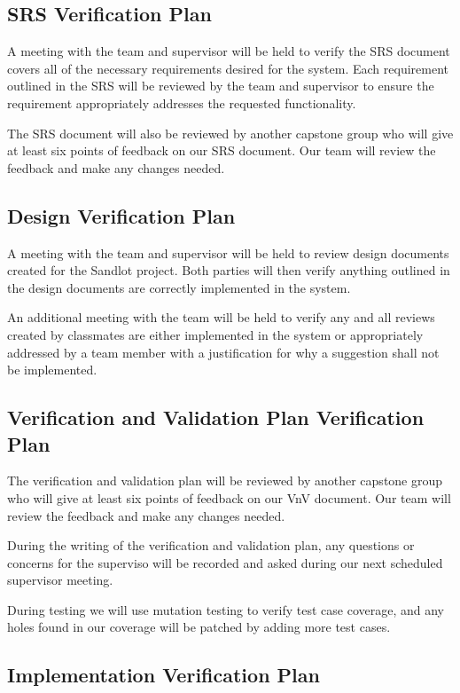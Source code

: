 \documentclass[12pt, titlepage]{article}
\begin{document}
\subsection{SRS Verification Plan}

A meeting with the team and supervisor will be held to verify the SRS document covers all of
the necessary requirements desired for the system. Each requirement outlined in the SRS will
be reviewed by the team and supervisor to ensure the requirement appropriately addresses the
requested functionality.

The SRS document will also be reviewed by another capstone group who will give
at least six points of feedback on our SRS document. Our team will review the
feedback and make any changes needed.

\subsection{Design Verification Plan}

A meeting with the team and supervisor will be held to review design documents created
for the Sandlot project. Both parties will then verify anything outlined in the design
documents are correctly implemented in the system.

An additional meeting with the team will be held to verify any and all reviews created by
classmates are either implemented in the system or appropriately addressed by a team member
with a justification for why a suggestion shall not be implemented.

\subsection{Verification and Validation Plan Verification Plan}

The verification and validation plan will be reviewed by another capstone
group who will give at least six points of feedback on our VnV document. Our
team will review the feedback and make any changes needed. 

During the writing of the verification and validation plan, any questions or
concerns for the superviso will be recorded and asked during our next
scheduled supervisor meeting.

During testing we will use mutation testing to verify test case coverage, and
any holes found in our coverage will be patched by adding more test cases.

\subsection{Implementation Verification Plan}
\end{document}
